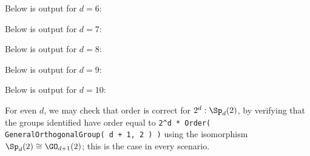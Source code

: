 

Below is output for $d = 6$:



Below is output for $d = 7$:



Below is output for $d = 8$:



Below is output for $d = 9$:



Below is output for $d = 10$:



For even $d$, we may check that order is correct for $2^d : \Sp_d(2)$, by verifying that the groups identified have order equal to \texttt{2\^{}d * Order( GeneralOrthogonalGroup( d + 1, 2 ) )} using the isomorphism $\Sp_d(2) \cong \GO_{d+1}(2)$; this is the case in every scenario.

% 
